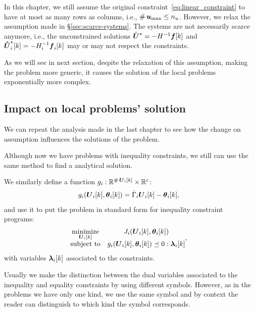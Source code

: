 \documentclass[../main.tex]{subfiles}
\begin{document}
In this chapter, we still assume the original constraint~\eqref{eq:linear_constraint} to have at most as many rows as columns, i.e., $\operatorname{\#}{\boldsymbol{u}_{\max}}\leq n_{u}$.
However, we relax the assumption made in \S\ref{sec:scarce-systems}.
The systems are not necessarily scarce anymore, i.e., the unconstrained solutions
${\mathring{\boldsymbol{U}}^{\star}}=-H^{-1}\boldsymbol{f}[k]$ and $\optuncUik=-H_{i}^{-1}\vec{f}_{i}[k]$ may or may not respect the constraints.

As we will see in next section, despite the relaxation of this assumption, making the problem more generic, it causes the solution of the local problems exponentially more complex.

\subsection{Impact on local problems' solution}\label{sec:impact-local-problem}
We can repeat the analysis made in the last chapter to see how the change on assumption influences the solutions of the problem.

Although now we have \qp{} problems with inequality constraints, we still can use the same method to find a analytical solution.

We similarly define a function $g_i:\mathbb{R}^{\operatorname{\#}\boldsymbol{U}_{i}[k]}\times \mathbb{R}^{c}$:
\begin{equation}
  \label{eq:lagrangian_inequality}
  \inequalityfunction=\bar{\Gamma}_{i}\vec{U}_i[k]-\thetaik,
\end{equation}
and use it to put the problem in standard form for inequality constraint \qp{} programs:
\begin{equation}
  \begin{matrix}
    \label{eq:local_problem_equality_standard_notation}
    \minimize\limits_{\vec{U}_{i}[k]}&\obji(\vec{U}_{i}[k],\thetaik)\\
    \mathrm{subject~ to} & \inequalityfunction\preceq 0:\lambdaik
  \end{matrix},
\end{equation}
with variables $\lambdaik$ associated to the constraints.
\begin{remark}
  Usually we make the distinction between the dual variables associated to the inequality and equality constraints by using different symbols.
  However, as in the problems we have only one kind, we use the same symbol and by context the reader can distinguish to which kind the symbol corresponds.
\end{remark}
\end{document}
